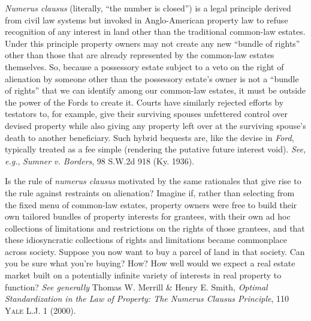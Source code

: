 \textit{Numerus clausus} (literally, ``the number is closed'') is a legal
principle derived from civil law systems but invoked in Anglo-American property
law to refuse recognition of any interest in land other than the traditional
common-law estates. Under this principle property owners may not create any new
``bundle of rights'' other than those that are already represented by the
common-law estates themselves. So, because a possessory estate subject to a
veto on the right of alienation by someone other than the possessory estate's
owner is not a ``bundle of rights'' that we can identify among our common-law
estates, it must be outside the power of the Fords to create it. Courts have
similarly rejected efforts by testators to, for example, give their surviving
spouses unfettered control over devised property while also giving any property
left over at the surviving spouse's death to another beneficiary. Such hybrid
bequests are, like the devise in \textit{Ford}, typically treated as a fee
simple (rendering the putative future interest void). \textit{See, e.g.},
\emph{Sumner v. Borders}, 98 S.W.2d 918 (Ky. 1936).



Is the rule of \textit{numerus clausus} motivated by the same rationales that
give rise to the rule against restraints on alienation? Imagine if, rather than
selecting from the fixed menu of common-law estates, property owners were free
to build their own tailored bundles of property interests for grantees, with
their own ad hoc collections of limitations and restrictions on the rights of
those grantees, and that these idiosyncratic collections of rights and
limitations became commonplace across society. Suppose you now want to buy a
parcel of land in that society. Can you be sure what you're buying? How? How
well would we expect a real estate market built on a potentially infinite
variety of interests in real property to function? \textit{See generally}
Thomas W. Merrill \& Henry E. Smith, \textit{Optimal Standardization in the Law
of Property: The Numerus Clausus Principle}, 110 \textsc{Yale L.J.} 1 (2000).


